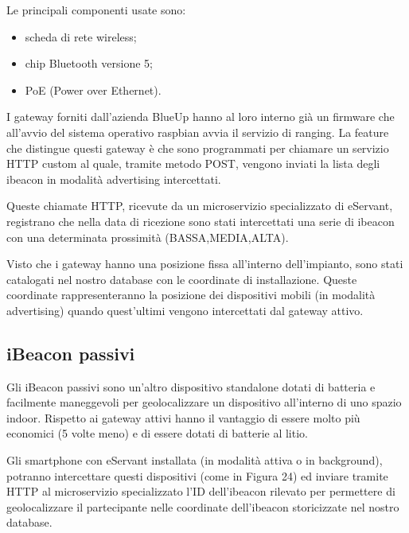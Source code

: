 Le principali componenti usate sono:
\begin{itemize}
    \item scheda di rete wireless;
    \item chip Bluetooth versione 5;
    \item PoE (Power over Ethernet).
\end{itemize}

I gateway forniti dall'azienda BlueUp hanno al loro interno già un firmware che all'avvio del sistema operativo
raspbian avvia il servizio di ranging.
La feature che distingue questi gateway è che sono programmati per chiamare un servizio HTTP custom 
al quale, tramite metodo POST, vengono inviati la lista degli ibeacon in modalità advertising intercettati.

Queste chiamate HTTP, ricevute da un microservizio specializzato di eServant, registrano che nella data
di ricezione sono stati intercettati una serie di ibeacon con una determinata prossimità (BASSA,MEDIA,ALTA).

Visto che i gateway hanno una posizione fissa all'interno dell'impianto, sono stati catalogati nel nostro
database con le coordinate di installazione.
Queste coordinate rappresenteranno la posizione dei dispositivi mobili (in modalità advertising) quando quest'ultimi
vengono intercettati dal gateway attivo.

\subsection{iBeacon passivi}
Gli iBeacon passivi sono un'altro dispositivo standalone dotati di batteria e facilmente maneggevoli per
geolocalizzare un dispositivo all'interno di uno spazio indoor.
Rispetto ai gateway attivi hanno il vantaggio di essere molto più economici (5 volte meno) e di essere
dotati di batterie al litio.

Gli smartphone con eServant installata (in modalità attiva o in background), potranno intercettare
questi dispositivi (come in Figura 24) ed inviare tramite HTTP al microservizio specializzato l'ID dell'ibeacon rilevato
per permettere di geolocalizzare il partecipante nelle coordinate dell'ibeacon storicizzate nel nostro
database.

